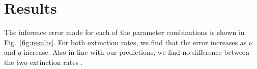 \section{Results}

The inference error made for each of the parameter combinations
is shown in Fig.~\ref{fig:results}. For both extinction rates,
we find that the error increases as $\nu$
and $q$ increase. Also in line with our predictions, we find no difference
between the two extinction rates .
